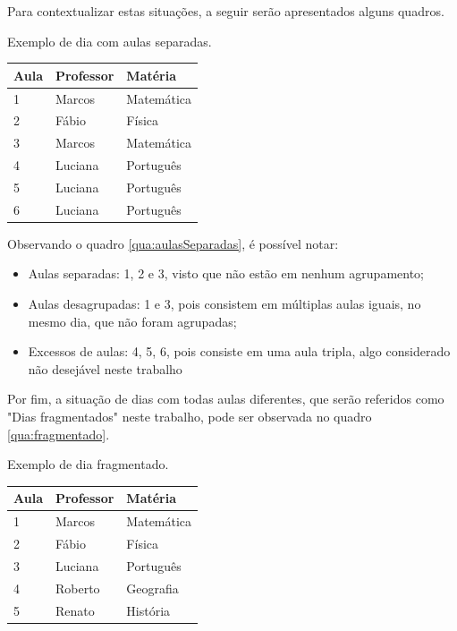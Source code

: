 Para contextualizar estas situações, a seguir serão apresentados alguns quadros.

\begin{quadro}[!htb]
	\centering
	\caption{Exemplo de dia com aulas separadas.\label{qua:aulasSeparadas}}
	\begin{tabular}{|p{3cm}|p{3cm}|p{3cm}|}
		\hline
		\textbf{Aula} & \textbf{Professor} & \textbf{Matéria} \\
		\hline
		1 & Marcos & Matemática \\
		\hline
		2 & Fábio & Física \\
		\hline
		3 & Marcos & Matemática \\
		\hline
		4 & Luciana & Português \\
		\hline
		5 & Luciana & Português \\
		\hline
		6 & Luciana & Português \\
		\hline
	\end{tabular}
\end{quadro}
\pagebreak

Observando o quadro \ref{qua:aulasSeparadas}, é possível notar:

\begin{itemize}
	\item Aulas separadas: 1, 2 e 3, visto que não estão em nenhum agrupamento;
	\item Aulas desagrupadas: 1 e 3, pois consistem em múltiplas aulas iguais, no mesmo dia, que não foram agrupadas;
	\item Excessos de aulas: 4, 5, 6, pois consiste em uma aula tripla, algo considerado não desejável neste trabalho
\end{itemize}

Por fim, a situação de dias com todas aulas diferentes, que serão referidos como "Dias fragmentados" neste trabalho, pode ser observada no quadro \ref{qua:fragmentado}.

\begin{quadro}[!htb]
	\centering
	\caption{Exemplo de dia fragmentado.\label{qua:fragmentado}}
	\begin{tabular}{|p{3cm}|p{3cm}|p{3cm}|}
		\hline
		\textbf{Aula} & \textbf{Professor} & \textbf{Matéria} \\
		\hline
		1 & Marcos & Matemática \\
		\hline
		2 & Fábio & Física \\
		\hline
		3 & Luciana & Português \\
		\hline
		4 & Roberto & Geografia \\
		\hline
		5 & Renato & História \\
		\hline
	\end{tabular}
\end{quadro}

